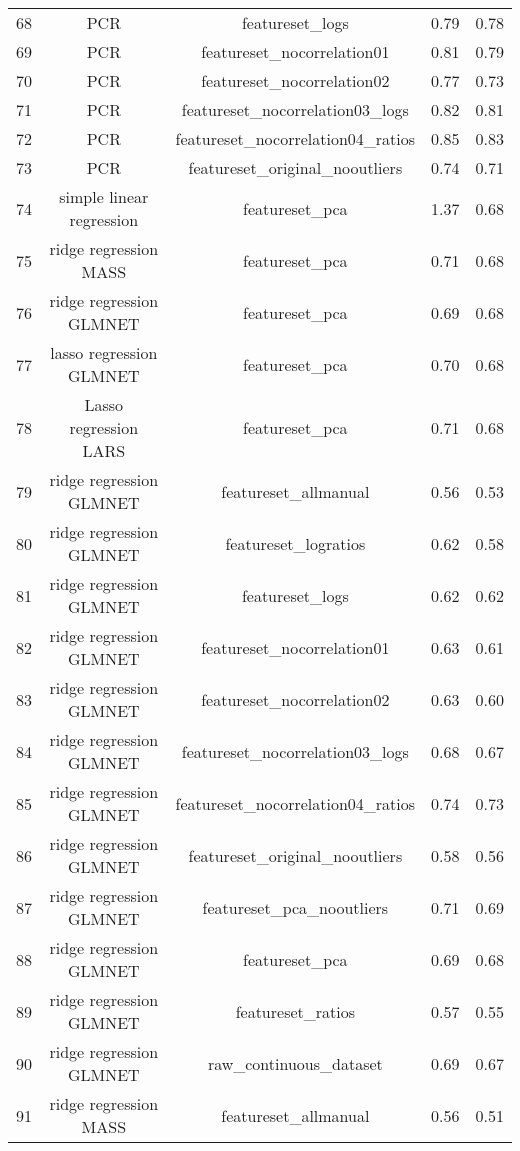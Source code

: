 \begin{tabular}{ccccc}
  68 & PCR & featureset\_logs & 0.79 & 0.78 \\ 
  69 & PCR & featureset\_nocorrelation01 & 0.81 & 0.79 \\ 
  70 & PCR & featureset\_nocorrelation02 & 0.77 & 0.73 \\ 
  71 & PCR & featureset\_nocorrelation03\_logs & 0.82 & 0.81 \\ 
  72 & PCR & featureset\_nocorrelation04\_ratios & 0.85 & 0.83 \\ 
  73 & PCR & featureset\_original\_nooutliers & 0.74 & 0.71 \\ 
  74 & simple linear regression & featureset\_pca & 1.37 & 0.68 \\ 
  75 & ridge regression MASS & featureset\_pca & 0.71 & 0.68 \\ 
  76 & ridge regression GLMNET & featureset\_pca & 0.69 & 0.68 \\ 
  77 & lasso regression GLMNET & featureset\_pca & 0.70 & 0.68 \\ 
  78 & Lasso regression LARS & featureset\_pca & 0.71 & 0.68 \\ 
  79 & ridge regression GLMNET & featureset\_allmanual & 0.56 & 0.53 \\ 
  80 & ridge regression GLMNET & featureset\_logratios & 0.62 & 0.58 \\ 
  81 & ridge regression GLMNET & featureset\_logs & 0.62 & 0.62 \\ 
  82 & ridge regression GLMNET & featureset\_nocorrelation01 & 0.63 & 0.61 \\ 
  83 & ridge regression GLMNET & featureset\_nocorrelation02 & 0.63 & 0.60 \\ 
  84 & ridge regression GLMNET & featureset\_nocorrelation03\_logs & 0.68 & 0.67 \\ 
  85 & ridge regression GLMNET & featureset\_nocorrelation04\_ratios & 0.74 & 0.73 \\ 
  86 & ridge regression GLMNET & featureset\_original\_nooutliers & 0.58 & 0.56 \\ 
  87 & ridge regression GLMNET & featureset\_pca\_nooutliers & 0.71 & 0.69 \\ 
  88 & ridge regression GLMNET & featureset\_pca & 0.69 & 0.68 \\ 
  89 & ridge regression GLMNET & featureset\_ratios & 0.57 & 0.55 \\ 
  90 & ridge regression GLMNET & raw\_continuous\_dataset & 0.69 & 0.67 \\ 
  91 & ridge regression MASS & featureset\_allmanual & 0.56 & 0.51 \\ 

\end{tabular}
